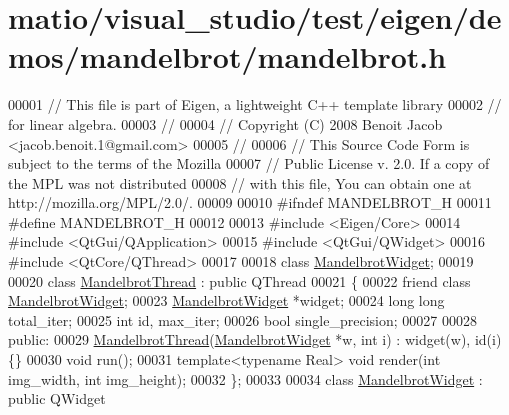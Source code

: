 \hypertarget{matio_2visual__studio_2test_2eigen_2demos_2mandelbrot_2mandelbrot_8h_source}{}\section{matio/visual\+\_\+studio/test/eigen/demos/mandelbrot/mandelbrot.h}
\label{matio_2visual__studio_2test_2eigen_2demos_2mandelbrot_2mandelbrot_8h_source}

\begin{DoxyCode}
00001 \textcolor{comment}{// This file is part of Eigen, a lightweight C++ template library}
00002 \textcolor{comment}{// for linear algebra.}
00003 \textcolor{comment}{//}
00004 \textcolor{comment}{// Copyright (C) 2008 Benoit Jacob <jacob.benoit.1@gmail.com>}
00005 \textcolor{comment}{//}
00006 \textcolor{comment}{// This Source Code Form is subject to the terms of the Mozilla}
00007 \textcolor{comment}{// Public License v. 2.0. If a copy of the MPL was not distributed}
00008 \textcolor{comment}{// with this file, You can obtain one at http://mozilla.org/MPL/2.0/.}
00009 
00010 \textcolor{preprocessor}{#ifndef MANDELBROT\_H}
00011 \textcolor{preprocessor}{#define MANDELBROT\_H}
00012 
00013 \textcolor{preprocessor}{#include <Eigen/Core>}
00014 \textcolor{preprocessor}{#include <QtGui/QApplication>}
00015 \textcolor{preprocessor}{#include <QtGui/QWidget>}
00016 \textcolor{preprocessor}{#include <QtCore/QThread>}
00017 
00018 \textcolor{keyword}{class }\hyperlink{class_mandelbrot_widget}{MandelbrotWidget};
00019 
00020 \textcolor{keyword}{class }\hyperlink{class_mandelbrot_thread}{MandelbrotThread} : \textcolor{keyword}{public} QThread
00021 \{
00022     \textcolor{keyword}{friend} \textcolor{keyword}{class }\hyperlink{class_mandelbrot_widget}{MandelbrotWidget};
00023     \hyperlink{class_mandelbrot_widget}{MandelbrotWidget} *widget;
00024     \textcolor{keywordtype}{long} \textcolor{keywordtype}{long} total\_iter;
00025     \textcolor{keywordtype}{int} id, max\_iter;
00026     \textcolor{keywordtype}{bool} single\_precision;
00027 
00028   \textcolor{keyword}{public}:
00029     \hyperlink{class_mandelbrot_thread}{MandelbrotThread}(\hyperlink{class_mandelbrot_widget}{MandelbrotWidget} *w, \textcolor{keywordtype}{int} i) : widget(w), id(i) \{\}
00030     \textcolor{keywordtype}{void} run();
00031     \textcolor{keyword}{template}<\textcolor{keyword}{typename} Real> \textcolor{keywordtype}{void} render(\textcolor{keywordtype}{int} img\_width, \textcolor{keywordtype}{int} img\_height);
00032 \};
00033 
00034 \textcolor{keyword}{class }\hyperlink{class_mandelbrot_widget}{MandelbrotWidget} : \textcolor{keyword}{public} QWidget

\end{DoxyCode}

